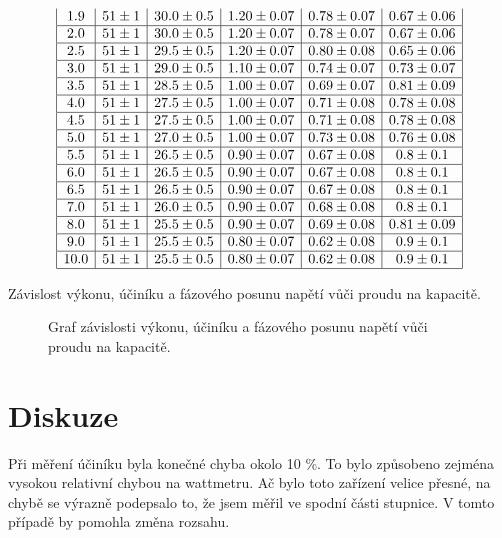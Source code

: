 \documentclass[a4paper,12pt]{article}
\begin{document}
\begin{table}
$$\begin{array}{|c|c|c|c|c|c|}
1.9&51\pm 1&30.0\pm 0.5&1.20\pm 0.07&0.78\pm 0.07&0.67\pm0.06\\ \hline
2.0&51\pm 1&30.0\pm 0.5&1.20\pm 0.07&0.78\pm 0.07&0.67\pm0.06\\ \hline
2.5&51\pm 1&29.5\pm 0.5&1.20\pm 0.07&0.80\pm 0.08&0.65\pm0.06\\ \hline
3.0&51\pm 1&29.0\pm 0.5&1.10\pm 0.07&0.74\pm 0.07&0.73\pm0.07\\ \hline
3.5&51\pm 1&28.5\pm 0.5&1.00\pm 0.07&0.69\pm 0.07&0.81\pm0.09\\ \hline
4.0&51\pm 1&27.5\pm 0.5&1.00\pm 0.07&0.71\pm 0.08&0.78\pm0.08\\ \hline
4.5&51\pm 1&27.5\pm 0.5&1.00\pm 0.07&0.71\pm 0.08&0.78\pm0.08\\ \hline
5.0&51\pm 1&27.0\pm 0.5&1.00\pm 0.07&0.73\pm 0.08&0.76\pm0.08\\ \hline
5.5&51\pm 1&26.5\pm 0.5&0.90\pm 0.07&0.67\pm 0.08&0.8\pm0.1\\ \hline
6.0&51\pm 1&26.5\pm 0.5&0.90\pm 0.07&0.67\pm 0.08&0.8\pm0.1\\ \hline
6.5&51\pm 1&26.5\pm 0.5&0.90\pm 0.07&0.67\pm 0.08&0.8\pm0.1\\ \hline
7.0&51\pm 1&26.0\pm 0.5&0.90\pm 0.07&0.68\pm 0.08&0.8\pm0.1\\ \hline
8.0&51\pm 1&25.5\pm 0.5&0.90\pm 0.07&0.69\pm 0.08&0.81\pm0.09\\ \hline
9.0&51\pm 1&25.5\pm 0.5&0.80\pm 0.07&0.62\pm 0.08&0.9\pm0.1\\ \hline
10.0&51\pm 1&25.5\pm 0.5&0.80\pm 0.07&0.62\pm 0.08&0.9\pm0.1\\ \hline
\end{array}
$$
\caption{Závislost výkonu, účiníku a fázového posunu napětí vůči proudu na kapacitě.}
\label{TUk3}
\end{table}

\begin{figure}

\caption{Graf závislosti výkonu, účiníku a fázového posunu napětí vůči proudu na kapacitě.}
\label{g1}
\end{figure}

\section{Diskuze}
Při měření účiníku byla konečné chyba okolo 10 \%. To bylo způsobeno zejména vysokou relativní 
chybou na wattmetru. Ač bylo toto zařízení velice přesné, na chybě se výrazně podepsalo to, že 
jsem měřil ve spodní části stupnice. V tomto případě by pomohla změna rozsahu.
\end{document}
